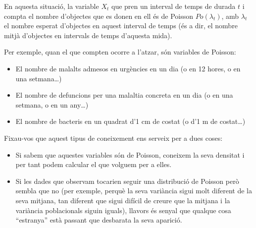 \documentclass[
]{book}
\newenvironment{rmdblock}[1]
  {
  \begin{itemize}
  \renewcommand{\labelitemi}{
    \raisebox{-.7\height}[0pt][0pt]{
      {\setkeys{Gin}{width=3em,keepaspectratio}\texttt{[image: Bioestadística-II\_files/figure-html/\#1]}}
    }
  }
  \setlength{\fboxsep}{1em}
  \begin{kframe}
  \item
  }
  {
  \end{kframe}
  \end{itemize}
  }
\newenvironment{rmdimportant}
  {\begin{rmdblock}{important}}
  {\end{rmdblock}}
\theoremstyle{definition}
\theoremstyle{definition}
\theoremstyle{definition}
\theoremstyle{remark}
\begin{document}
\begin{rmdimportant}
En aquesta situació, la variable \(X_t\) que pren un interval de temps de durada \(t\) i compta el nombre d'objectes que es donen en ell és de Poisson \(Po(\lambda_t)\), amb \(\lambda_t\) el nombre esperat d'objectes en aquest interval de temps (és a dir, el nombre mitjà d'objectes en intervals de temps d'aquesta mida).
\end{rmdimportant}

Per exemple, quan el que compten ocorre a l'atzar, són variables de Poisson:

\begin{itemize}
\item
  El nombre de malalts admesos en urgències en un dia (o en 12 hores, o en una setmana\ldots)
\item
  El nombre de defuncions per una malaltia concreta en un dia (o en una setmana, o en un any\ldots)
\item
  El nombre de bacteris en un quadrat d'1 cm de costat (o d'1 m de costat\ldots)
\end{itemize}

Fixau-vos que aquest tipus de coneixement ens serveix per a dues coses:

\begin{itemize}
\item
  Si sabem que aquestes variables són de Poisson, coneixem la seva densitat i per tant podem calcular el que volguem per a elles.
\item
  Si les dades que observam tocarien seguir una distribució de Poisson però sembla que no (per exemple, perquè la seva variància sigui molt diferent de la seva mitjana, tan diferent que sigui difícil de creure que la mitjana i la variància poblacionals siguin iguals), llavors és senyal que qualque cosa ``estranya'' està passant que desbarata la seva aparició.
\end{itemize}
\end{document}
